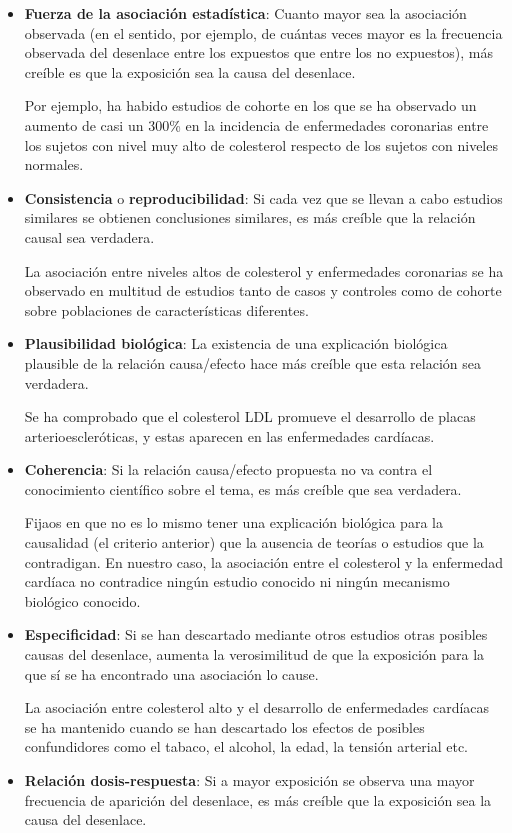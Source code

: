 \documentclass[
]{book}
\theoremstyle{definition}
\theoremstyle{definition}
\theoremstyle{definition}
\theoremstyle{definition}
\theoremstyle{remark}
\begin{document}
\begin{itemize}
\item
  \textbf{Fuerza de la asociación estadística}: Cuanto mayor sea la asociación observada (en el sentido, por ejemplo, de cuántas veces mayor es la frecuencia observada del desenlace entre los expuestos que entre los no expuestos), más creíble es que la exposición sea la causa del desenlace.

  Por ejemplo, ha habido estudios de cohorte en los que se ha observado un aumento de casi un 300\% en la incidencia de enfermedades coronarias entre los sujetos con nivel muy alto de colesterol respecto de los sujetos con niveles normales.
\item
  \textbf{Consistencia} o \textbf{reproducibilidad}: Si cada vez que se llevan a cabo estudios similares se obtienen conclusiones similares, es más creíble que la relación causal sea verdadera.

  La asociación entre niveles altos de colesterol y enfermedades coronarias se ha observado en multitud de estudios tanto de casos y controles como de cohorte sobre poblaciones de características diferentes.
\item
  \textbf{Plausibilidad biológica}: La existencia de una explicación biológica plausible de la relación causa/efecto hace más creíble que esta relación sea verdadera.

  Se ha comprobado que el colesterol LDL promueve el desarrollo de placas arterioescleróticas, y estas aparecen en las enfermedades cardíacas.
\item
  \textbf{Coherencia}: Si la relación causa/efecto propuesta no va contra el conocimiento científico sobre el tema, es más creíble que sea verdadera.

  Fijaos en que no es lo mismo tener una explicación biológica para la causalidad (el criterio anterior) que la ausencia de teorías o estudios que la contradigan. En nuestro caso, la asociación entre el colesterol y la enfermedad cardíaca no contradice ningún estudio conocido ni ningún mecanismo biológico conocido.
\item
  \textbf{Especificidad}: Si se han descartado mediante otros estudios otras posibles causas del desenlace, aumenta la verosimilitud de que la exposición para la que sí se ha encontrado una asociación lo cause.

  La asociación entre colesterol alto y el desarrollo de enfermedades cardíacas se ha mantenido cuando se han descartado los efectos de posibles confundidores como el tabaco, el alcohol, la edad, la tensión arterial etc.
\item
  \textbf{Relación dosis-respuesta}: Si a mayor exposición se observa una mayor frecuencia de aparición del desenlace, es más creíble que la exposición sea la causa del desenlace.


\end{itemize}
\end{document}
